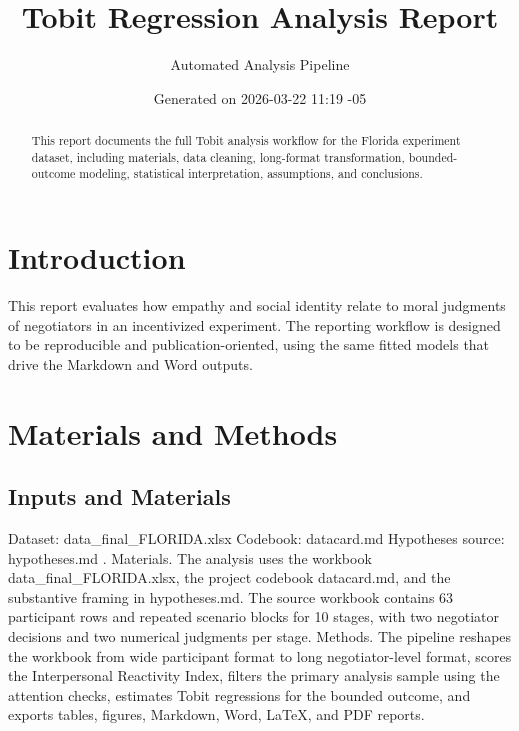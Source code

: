 \documentclass[11pt]{article}
\title{Tobit Regression Analysis Report}
\author{Automated Analysis Pipeline}
\date{Generated on 2026-03-22 11:19 -05}
\begin{document}
\maketitle
\begin{abstract}
This report documents the full Tobit analysis workflow for the Florida experiment dataset, including materials, data cleaning, long-format transformation, bounded-outcome modeling, statistical interpretation, assumptions, and conclusions.
\end{abstract}
\section{Introduction}
This report evaluates how empathy and social identity relate to moral judgments of negotiators in an incentivized experiment. The reporting workflow is designed to be reproducible and publication-oriented, using the same fitted models that drive the Markdown and Word outputs.
\section{Materials and Methods}
\subsection{Inputs and Materials}
Dataset: data\_final\_FLORIDA.xlsx Codebook: datacard.md Hypotheses source: hypotheses.md .
Materials. The analysis uses the workbook data\_final\_FLORIDA.xlsx, the project codebook datacard.md, and the substantive framing in hypotheses.md. The source workbook contains 63 participant rows and repeated scenario blocks for 10 stages, with two negotiator decisions and two numerical judgments per stage. Methods. The pipeline reshapes the workbook from wide participant format to long negotiator-level format, scores the Interpersonal Reactivity Index, filters the primary analysis sample using the attention checks, estimates Tobit regressions for the bounded outcome, and exports tables, figures, Markdown, Word, LaTeX, and PDF reports.
\end{document}
